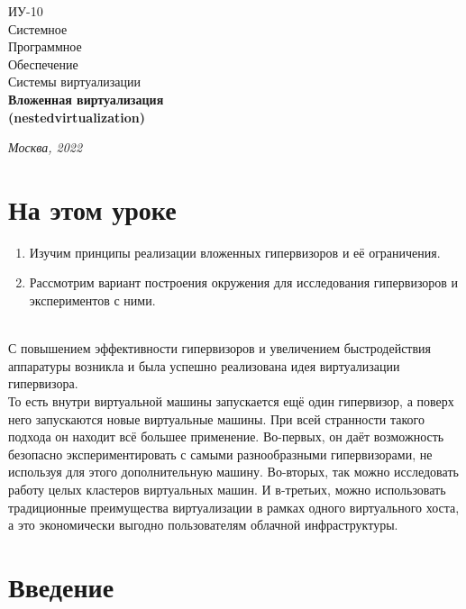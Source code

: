 \documentclass[14pt, a4paper]{article}
\begin{document}
\begin{titlepage}
    \topmargin=216pt
    \newpage
    \hangindent=0.7cm
    \huge ИУ-10\\
    Системное\\
    Программное\\
    Обеспечение\\
    Системы виртуализации\\
    \textbf{Вложенная
    виртуализация \\
    (nestedvirtualization)}

    \vspace{9cm}

    \begin{center}
        \small\textit{Москва, 2022}
    \end{center}
\end{titlepage}

\section*{На этом уроке}
\begin{enumerate}
    \item Изучим принципы реализации вложенных гипервизоров и её ограничения.
    \item Рассмотрим вариант построения окружения для исследования гипервизоров и экспериментов
    с ними.
\end{enumerate}

\tableofcontents \mbox{}\\

С повышением эффективности гипервизоров и увеличением быстродействия аппаратуры возникла и
была успешно реализована идея виртуализации гипервизора.\\

То есть внутри виртуальной машины запускается ещё один гипервизор, а поверх него запускаются
новые виртуальные машины. При всей странности такого подхода он находит всё большее
применение. Во-первых, он даёт возможность безопасно экспериментировать с самыми
разнообразными гипервизорами, не используя для этого дополнительную машину. Во-вторых, так
можно исследовать работу целых кластеров виртуальных машин. И в-третьих, можно использовать
традиционные преимущества виртуализации в рамках одного виртуального хоста, а это экономически
выгодно пользователям облачной инфраструктуры.
\newpage

\section*{Введение}
\end{document}
